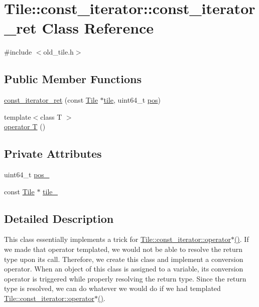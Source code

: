 \hypertarget{classTile_1_1const__iterator_1_1const__iterator__ret}{}\section{Tile\+:\+:const\+\_\+iterator\+:\+:const\+\_\+iterator\+\_\+ret Class Reference}
\label{classTile_1_1const__iterator_1_1const__iterator__ret}


{\ttfamily \#include $<$old\+\_\+tile.\+h$>$}

\subsection*{Public Member Functions}
\begin{DoxyCompactItemize}
\item 
\hyperlink{classTile_1_1const__iterator_1_1const__iterator__ret_aac922cd2abb6989e287ba4f8d8df4248}{const\+\_\+iterator\+\_\+ret} (const \hyperlink{classTile}{Tile} $\ast$\hyperlink{classTile_1_1const__iterator_a431e300f015ea57c6d02cac7ab49eb71}{tile}, uint64\+\_\+t \hyperlink{classTile_1_1const__iterator_aa369b7db490030753e61dbec3e372a0b}{pos})
\item 
{\footnotesize template$<$class T $>$ }\\\hyperlink{classTile_1_1const__iterator_1_1const__iterator__ret_a06280807100d44f9ddc819fca9dcc825}{operator T} ()
\end{DoxyCompactItemize}
\subsection*{Private Attributes}
\begin{DoxyCompactItemize}
\item 
uint64\+\_\+t \hyperlink{classTile_1_1const__iterator_1_1const__iterator__ret_ac806ca3ba6b003e85b5f6ac933967aca}{pos\+\_\+}
\item 
const \hyperlink{classTile}{Tile} $\ast$ \hyperlink{classTile_1_1const__iterator_1_1const__iterator__ret_a8afa330d88c985a9e3d5f6351e01302b}{tile\+\_\+}
\end{DoxyCompactItemize}


\subsection{Detailed Description}
This class essentially implements a trick for \hyperlink{classTile_1_1const__iterator_afe2bc5002bb3248a12caccb9f2f02039}{Tile\+::const\+\_\+iterator\+::operator$\ast$()}. If we made that operator templated, we would not be able to resolve the return type upon its call. Therefore, we create this class and implement a conversion operator. When an object of this class is assigned to a variable, its conversion operator is triggered while properly resolving the return type. Since the return type is resolved, we can do whatever we would do if we had templated \hyperlink{classTile_1_1const__iterator_afe2bc5002bb3248a12caccb9f2f02039}{Tile\+::const\+\_\+iterator\+::operator$\ast$()}. 


